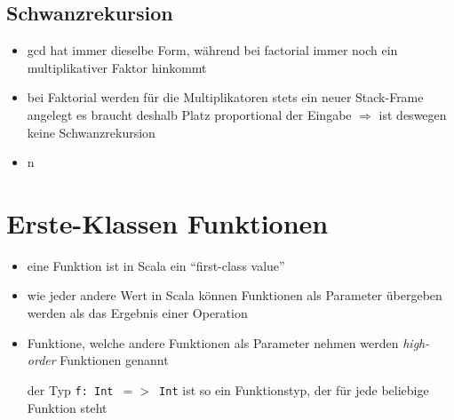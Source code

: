 \subsection{Schwanzrekursion}






\begin{itemize}
  \item gcd hat immer dieselbe Form, während bei factorial immer noch ein
  multiplikativer Faktor hinkommt
  \item bei Faktorial werden für die Multiplikatoren stets ein neuer
  Stack-Frame angelegt \und es braucht deshalb Platz proportional der
  Eingabe $\Rightarrow$ ist deswegen keine Schwanzrekursion
  \item n
\end{itemize}
\pagebreak


\section{Erste-Klassen Funktionen}
\begin{itemize}
  \item eine Funktion ist in Scala ein \enquote{first-class value}
  \item wie jeder andere Wert in Scala können Funktionen als Parameter
  übergeben werden \oder als das Ergebnis einer Operation
  \item Funktione, welche andere Funktionen als Parameter nehmen werden
  \textit{high-order} Funktionen genannt
  
  
  
  der Typ \texttt{f: Int $=>$ Int} ist so ein Funktionstyp, der für jede
  beliebige Funktion steht
\end{itemize}


